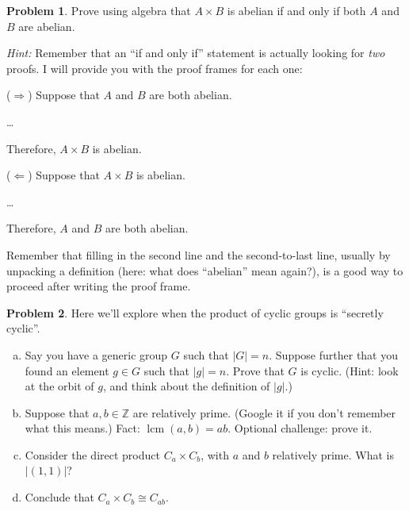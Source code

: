 \documentclass[12pt]{article}
\theoremstyle{definition} %
\newtheorem{problem}{Problem}
\newcommand{\Alert}[1]{\textcolor{xRed}{#1}}
\newcommand{\Z}{\mathbb{Z}}
\DeclareMathOperator{\lcm}{lcm}
\begin{document}
\begin{problem}
    Prove using algebra that $A\times B$ is abelian \Alert{if and only if} both $A$ and $B$ are abelian.

    \textit{Hint:} Remember that an \Alert{``if and only if''} statement is actually looking for \textit{two} proofs. I will provide you with the proof frames for each one:
    \begin{multicols}{2}
        ($\Rightarrow$) Suppose that $A$ and $B$ are both abelian.

        \ldots

        Therefore, $A\times B$ is abelian.

        ($\Leftarrow$) Suppose that $A\times B$ is abelian.

        \ldots

        Therefore, $A$ and $B$ are both abelian.
    \end{multicols}

    Remember that filling in the second line and the second-to-last line, usually by unpacking a definition (here: what does ``abelian'' mean again?), is a good way to proceed after writing the proof frame.
    
\end{problem}

\begin{problem}
    Here we'll explore when the product of cyclic groups is ``secretly cyclic''.
    \begin{enumerate}[(a)]
        \item Say you have a generic group $G$ such that $|G| = n$. Suppose further that you found an element $g\in G$ such that $|g| = n$. Prove that $G$ is cyclic. (Hint: look at the orbit of $g$, and think about the definition of $|g|$.)

        \item Suppose that $a, b \in \Z$ are relatively prime. (Google it if you don't remember what this means.) Fact: $\lcm(a, b) = ab.$ Optional challenge: prove it.

        \item Consider the direct product $C_a \times C_b$, with $a$ and $b$ relatively prime. What is $|(1,1)|$?

        \item Conclude that $C_a \times C_b \cong C_{ab}.$
    \end{enumerate}
\end{problem}
\end{document}
